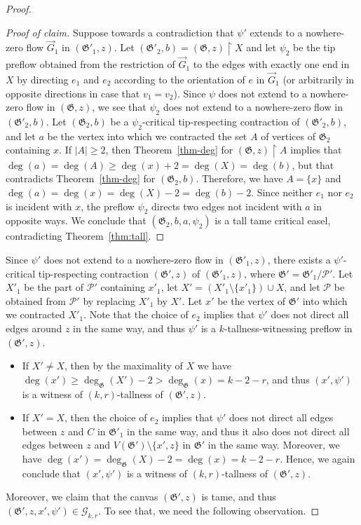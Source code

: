 \documentclass{article}
\newcommand{\PP}{\mathcal{P}}
\newcommand{\GG}{\mathcal{G}}
\newcommand\g{\mathfrak{G}}
\newenvironment{subproof}{%
  \renewcommand{\qedsymbol}{$\blacksquare$}%
  \begin{proof}[Proof of claim]%
}{%
  \end{proof}%
}
\begin{document}
\begin{proof}
\begin{subproof}
Suppose towards a contradiction that $\psi'$ extends to a nowhere-zero flow
$\vec{G}_1$ in $(\g'_1,z)$.  Let $(\g'_2,b)=(\g,z)\restriction X$ and let
$\psi_2$ be the tip preflow obtained from the restriction of $\vec{G}_1$ to
the edges with exactly one end in $X$ by directing $e_1$ and $e_2$ according to the orientation of $e$ in $\vec{G}_1$
(or arbitrarily in opposite directions in case that $v_1=v_2$).  Since $\psi$ does not extend to a nowhere-zero flow in $(\g,z)$,
we see that $\psi_2$ does not extend to a nowhere-zero flow in $(\g'_2,b)$.  Let $(\g_2,b)$ be a $\psi_2$-critical tip-respecting contraction of $(\g'_2,b)$,
and let $a$ be the vertex into which we contracted the set $A$ of vertices of $\g_2$ containing $x$.  If $|A|\ge 2$, then Theorem~\ref{thm-deg} for
$(\g,z)\restriction A$ implies that $\deg(a)=\deg(A)\ge \deg(x)+2=\deg(X)=\deg(b)$, but that contradicts Theorem~\ref{thm-deg} for $(\g_2,b)$.
Therefore, we have $A=\{x\}$ and $\deg(a)=\deg(x)=\deg(X)-2=\deg(b)-2$.  Since neither $e_1$ nor $e_2$ is incident with $x$, the preflow $\psi_2$ directs two edges not incident with $a$
in opposite ways.  We conclude that $(\g_2,b,a,\psi_2)$ is a tall tame critical easel, contradicting Theorem~\ref{thm:tall}.
\end{subproof}
Since $\psi'$ does not extend to a nowhere-zero flow in $(\g'_1,z)$, there exists a $\psi'$-critical tip-respecting contraction $(\g',z)$ of $(\g'_1,z)$, where $\g'=\g'_1/\PP'$.
Let $X'_1$ be the part of $\PP'$ containing $x'_1$, let $X'=(X'_1\setminus \{x'_1\})\cup X$, and let $\PP$ be obtained from $\PP'$ by replacing $X'_1$ by $X'$.
Let $x'$ be the vertex of $\g'$ into which we contracted $X'_1$.  Note that the choice of $e_2$ implies that $\psi'$ does not direct all edges around $z$ in the same way,
and thus $\psi'$ is a $k$-tallness-witnessing preflow in $(\g',z)$.
\begin{itemize}
\item If $X'\neq X$, then by the maximality of $X$ we have $\deg(x')\ge \deg_{\g}(X')-2>\deg_{\g}(x)=k-2-r$, and thus $(x',\psi')$ is a witness of $(k,r)$-tallness of $(\g',z)$.
\item If $X'=X$, then the choice of $e_2$ implies that $\psi'$ does not direct all edges between $z$ and $C$ in $\g'_1$ in the same way, and thus it also does not
direct all edges between $z$ and $V(\g')\setminus \{x',z\}$ in $\g'$ in the same way.  Moreover, we have $\deg(x')=\deg_{\g}(X)-2=\deg(x)=k-2-r$.
Hence, we again conclude that $(x',\psi')$ is a witness of $(k,r)$-tallness of $(\g',z)$.
\end{itemize}
Moreover, we claim that the canvas $(\g',z)$ is tame, and thus $(\g',z,x',\psi')\in \GG_{k,r}$.  To see that, we need the following observation.


\end{proof}
\end{document}
